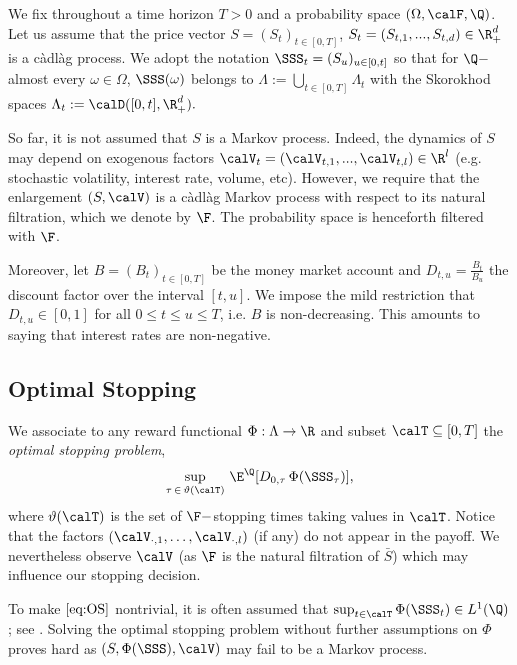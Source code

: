 
We fix throughout a time horizon $T>0$ and a probability space $(\Omega, \calF, \Q)$.  
Let us assume that the price vector $S = (S_t)_{t\in [0,T]}$, $S_t = (S_{t,1},...,S_{t,d}) \in \R_{+}^d$  is a c\`adl\`ag  process. 
We adopt the notation $\SSS_t = (S_u)_{u\in [0,t]}$ so that for 
$\Q-$almost every $\omega \in \Omega$,  $\SSS(\omega)$ belongs to $ \Lambda := \bigcup_{t\in [0,T]} \Lambda_t$ with the  Skorokhod spaces $\Lambda_t := \calD([0,t],\R^d_+).$ 

So far, it is not assumed that $S$ is a Markov process. Indeed, the dynamics of $S$ may depend on exogenous factors $\calV_t = (\calV_{t,1},...,\calV_{t,l}) \in \R^l$ (e.g. stochastic volatility, interest rate, volume, etc). However, we require that the enlargement $(S,\calV)$ is a c\`adl\`ag Markov  process with respect to its natural filtration, which we denote by $\F$. The probability space is henceforth filtered with $\F$. 

 
Moreover, let  $B=(B_t)_{t\in [0,T]}$ be the money market account and $D_{t,u} = \frac{B_t}{B_u}$ the 
discount factor over the interval $ [t,u]$. We  impose the mild restriction that $D_{t,u} \in [0,1]$ for all $0\le t \le u \le T$, i.e. $B$ is non-decreasing. This amounts to saying that interest rates are non-negative. 

\subsection{Optimal Stopping}
We  associate to any reward functional $\Phi: \Lambda \to \R$ and subset $\calT \subseteq [0,T]$ the \textit{optimal stopping problem}, 
\begin{equation}\label{eq:OS}
\underset{\tau \, \in \, \vartheta(\calT)}{\text{sup}} \ \E^{\Q}[D_{0,\tau}\, \Phi(\SSS_{\tau})],
\end{equation} 
where $\vartheta(\calT)$ is the set of $\F-$stopping times taking values in $\calT$. Notice that the factors $ (\calV_{\cdot,1},\ldots, \calV_{\cdot,l})$ (if any) do not appear in the payoff. We nevertheless observe $\calV$ (as $\F$ is the natural filtration of $\bar{S}$) which may influence our stopping decision. 

To make $\eqref{eq:OS}$ nontrivial,
it is often assumed that $\sup_{t \in \calT} \Phi(\SSS_{t}) \in L^1(\Q)$; see \cite{PeskirShiryaev}. Solving the optimal stopping problem without further assumptions on $\Phi$ proves hard as 
$(S,\Phi(\SSS),\calV)$ may fail to be a Markov process. 

